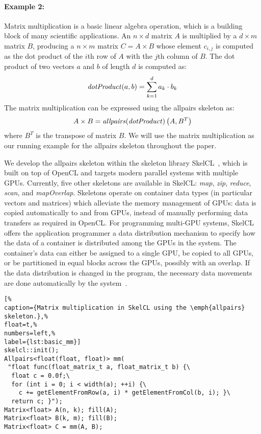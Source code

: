 \paragraph{Example 2:}
Matrix multiplication is a basic linear algebra operation, which is a building block of many scientific applications.
An $n\times d$ matrix $A$ is multiplied by a $d\times m$ matrix $B$, producing a $n\times m$ matrix $C=A\times B$ whose element $c_{i,j}$ is computed as the dot product of the $i$th row of $A$ with the $j$th column of $B$.
The dot product of two vectors $a$ and $b$ of length $d$ is computed as:
\begin{equation}
  \mbox{\emph{dotProduct}} (a,b) = \sum_{k=1}^d a_k \cdot b_k
\end{equation}
The matrix multiplication can be expressed using the allpairs skeleton as:
\begin{equation}
  A\times B = \mbox{\emph{allpairs}}(\mbox{\emph{dotProduct}})\left(A, B^T\right)
  \label{eq:mat_mult_allpairs}
\end{equation}
where $B^T$ is the transpose of matrix $B$.
We will use the matrix multiplication as our running example for the allpairs skeleton throughout the paper.

\vspace{1em}
We develop the allpairs skeleton within the skeleton library SkelCL~\cite{StKG-12}, which is built on top of OpenCL and targets modern parallel systems with multiple GPUs.
Currently, five other skeletons are available in SkelCL: \emph{map}, \emph{zip}, \emph{reduce}, \emph{scan}, and \emph{mapOverlap}.
Skeletons operate on container data types (in particular vectors and matrices) which alleviate the memory management of GPUs:
data is copied automatically to and from GPUs, instead of manually performing data transfers as required in OpenCL.
For programming multi-GPU systems, SkelCL offers the application programmer a data distribution mechanism to specify how the data of a container is distributed among the GPUs in the system.
The container's data can either be assigned to a single GPU, be copied to all GPUs, or be partitioned in equal blocks across the GPUs, possibly with an overlap.
If the data distribution is changed in the program, the necessary data movements are done automatically by the system~\cite{StKG-12}.

\begin{lstlisting}[%                                                             
caption={Matrix multiplication in SkelCL using the \emph{allpairs} skeleton.},%
float=t,%                                                                       
numbers=left,%
label={lst:basic_mm}]
skelcl::init();
Allpairs<float(float, float)> mm(
 "float func(float_matrix_t a, float_matrix_t b) {\
  float c = 0.0f;\
  for (int i = 0; i < width(a); ++i) {\
    c += getElementFromRow(a, i) * getElementFromCol(b, i); }\
  return c; }");
Matrix<float> A(n, k); fill(A);
Matrix<float> B(k, m); fill(B);
Matrix<float> C = mm(A, B);
\end{lstlisting}

